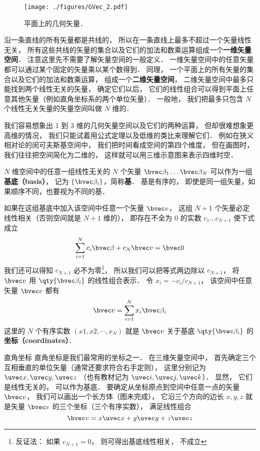 \begin{figure}[ht]
\centering
\texttt{[image: ./figures/GVec\_2.pdf]}
\caption{平面上的几何矢量．} \label{GVec_fig2}
\end{figure}










沿一条直线的所有矢量都是共线的， 所以在一条直线上最多不超过一个矢量线性无关， 所有这些共线的矢量的集合以及它们的加法和数乘运算组成一个\textbf{一维矢量空间}． 注意这里先不需要了解矢量空间的一般定义． 一维矢量空间中的任意矢量都可以通过某个固定的矢量乘以某个数得到． 同理， 一个平面上的所有矢量的集合以及它们的加法和数乘运算， 组成一个\textbf{二维矢量空间}， 二维矢量空间中最多只能找到两个线性无关的矢量， 确定它们以后， 它们的线性组合可以得到平面上任意其他矢量（例如直角坐标系的两个单位矢量）． 一般地， 我们把最多只包含 $N$ 个线性无关矢量的矢量空间叫做 $N$ 维的．

我们容易想象出 1 到 3 维的几何矢量空间以及它们的两种运算， 但却很难想象更高维的情况， 我们只能试着用公式定理以及低维的类比来理解它们． 例如在狭义相对论的闵可夫斯基空间中， 我们把时间看成空间的第四个维度， 但在画图时， 我们往往把空间简化为二维的， 这样就可以用三维示意图来表示四维时空．

$N$ 维空间中的任意一组线性无关的 $N$ 个矢量 $\bvec \beta_1\dots \bvec \beta_N$ 可以作为一组\textbf{基底（basis）}， 记为 $\{\bvec \beta_i\}$，简称\textbf{基}． 基是有序的， 即使是同一组矢量，如果顺序不同，也要视为不同的基．

如果在这组基底中加入该空间中任意一个矢量 $\bvec v$， 这组 $N+1$ 个矢量必定线性相关（否则空间就是 $N+1$ 维的）， 即存在不全为 0 的实数 $c_1\dots c_{N+1}$ 使下式成立
\begin{equation}
\sum_{i=1}^{N} c_i \bvec \beta + c_N \bvec v = \bvec 0
\end{equation}
我们还可以得知 $c_{N+1}$ 必不为零\footnote{反证法： 如果 $c_{N+1} = 0$， 则可得出基底线性相关， 不成立}， 所以我们可以把等式两边除以 $c_{N+1}$， 将 $\bvec v$ 用 $\qty{\bvec \beta_i}$ 的线性组合表示． 令 $x_i = -c_i/c_{N+1}$， 该空间中任意矢量 $\bvec v$ 都有
\begin{equation}\label{GVec_eq5}
\bvec v = \sum_{i=1}^N x_i \bvec \beta_i
\end{equation}
这里的 $N$ 个有序实数 $(x1, x2, \cdots, x_N)$ 就是 $\bvec v$ 关于基底 $\qty{\bvec \beta_i}$ 的\textbf{坐标（coordinates）}．

\begin{example}{直角坐标}
直角坐标是我们最常用的坐标之一． 在三维矢量空间中， 首先确定三个互相垂直的单位矢量（通常还要求符合右手定则）， 这里分别记为 $\uvec x, \uvec y, \uvec z$ （也有教材记为 $\uvec i, \uvec j, \uvec k$）． 显然， 它们是线性无关的， 可以作为基底． 要确定从坐标原点到空间中任意一点的矢量 $\bvec v$， 我们可以画出一个长方体（图未完成）， 它沿三个方向的边长 $x, y, z$ 就是矢量 $\bvec v$ 的三个坐标（三个有序实数）， 满足线性组合
\begin{equation}\label{GVec_eq4}
\bvec v = x\uvec x + y\uvec y + z\uvec z
\end{equation}
\end{example}

